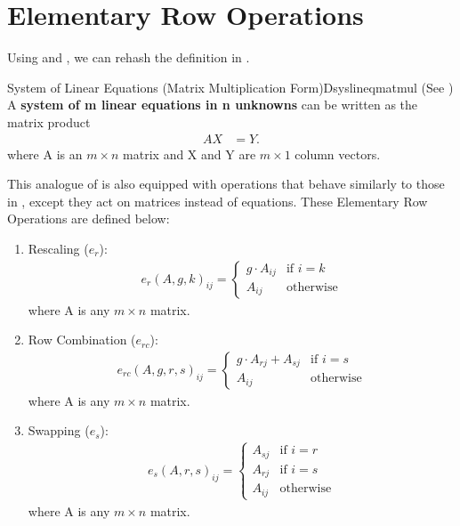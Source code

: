 \documentclass[oneside]{book}
\begin{document}
	\section{Elementary Row Operations}

	Using  and , we can rehash the definition in .
	
	 \begin{defn}{System of Linear Equations (Matrix Multiplication Form)}{Dsyslineqmatmul}
	 	(See )
	 	A \textbf{system of m linear equations in n unknowns} can be written as the matrix product
	 	\begin{equation*}
	 		\begin{split}
	 			AX &= Y.
	 		\end{split}
	 	\end{equation*}
		where A is an $m \times n$ matrix and X and Y are $m \times 1$ column vectors.	 
 	\end{defn}
 
 	This analogue of  is also equipped with operations that behave similarly to those in , except they act on matrices instead of equations. These Elementary Row Operations are defined below:
	\begin{enumerate}
		\item Rescaling ($e_r$):
		\begin{align*}
			e_r(A, g, k)_{ij} =\begin{cases}
				g \cdot A_{ij} & \text{if } i = k \\
				A_{ij} & \text{otherwise}
			\end{cases}
		\end{align*}
		where A is any $m \times n$ matrix.
		\item Row Combination ($e_{rc}$): 
		\begin{align*}
			e_{rc}(A, g, r, s)_{ij} =\begin{cases}
				g \cdot A_{rj} + A_{sj} & \text{if } i = s \\
				A_{ij} & \text{otherwise}
			\end{cases}
		\end{align*}
		where A is any $m \times n$ matrix.
		\item Swapping ($e_s$):
		\begin{align*}
			e_s(A, r, s)_{ij} =\begin{cases}
				A_{sj} & \text{if } i = r \\
				A_{rj} & \text{if } i = s \\
				A_{ij} & \text{otherwise}
			\end{cases}
		\end{align*} 
	where A is any $m \times n$ matrix.
	\end{enumerate}
\end{document}
